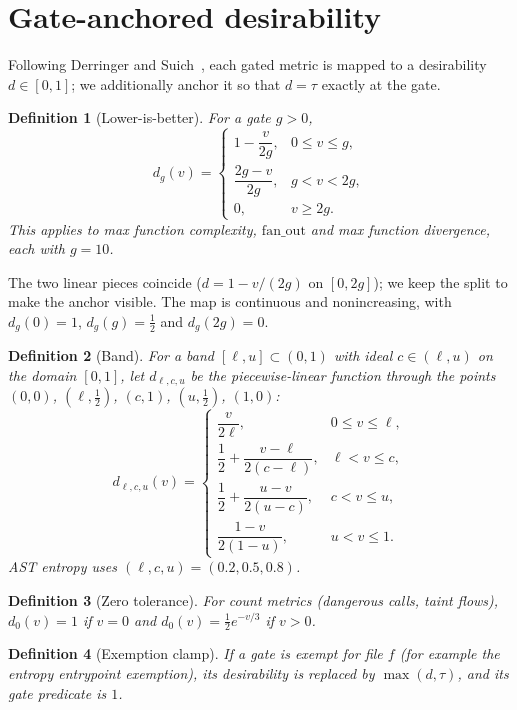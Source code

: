 \documentclass[11pt]{article}
\newtheorem{definition}{Definition}
\theoremstyle{remark}
\begin{document}
\section{Gate-anchored desirability}

Following Derringer and Suich~\cite{derringer1980}, each gated metric is mapped
to a desirability $d \in [0,1]$; we additionally anchor it so that
$d = \tau$ exactly at the gate.

\begin{definition}[Lower-is-better]
For a gate $g > 0$,
\[
d_g(v) =
\begin{cases}
1 - \dfrac{v}{2g}, & 0 \le v \le g,\\[6pt]
\dfrac{2g - v}{2g}, & g < v < 2g,\\[6pt]
0, & v \ge 2g.
\end{cases}
\]
This applies to max function complexity, $\mathrm{fan\_out}$ and max function
divergence, each with $g = 10$.
\end{definition}

The two linear pieces coincide ($d = 1 - v/(2g)$ on $[0, 2g]$); we keep the
split to make the anchor visible. The map is continuous and nonincreasing, with
$d_g(0) = 1$, $d_g(g) = \tfrac12$ and $d_g(2g) = 0$.

\begin{definition}[Band]
For a band $[\ell, u] \subset (0,1)$ with ideal $c \in (\ell, u)$ on the domain
$[0,1]$, let $d_{\ell,c,u}$ be the piecewise-linear function through the points
$(0,0)$, $(\ell, \tfrac12)$, $(c, 1)$, $(u, \tfrac12)$, $(1, 0)$:
\[
d_{\ell,c,u}(v) =
\begin{cases}
\dfrac{v}{2\ell}, & 0 \le v \le \ell,\\[6pt]
\dfrac12 + \dfrac{v - \ell}{2(c - \ell)}, & \ell < v \le c,\\[6pt]
\dfrac12 + \dfrac{u - v}{2(u - c)}, & c < v \le u,\\[6pt]
\dfrac{1 - v}{2(1 - u)}, & u < v \le 1.
\end{cases}
\]
AST entropy uses $(\ell, c, u) = (0.2, 0.5, 0.8)$.
\end{definition}

\begin{definition}[Zero tolerance]
For count metrics (dangerous calls, taint flows),
$d_0(v) = 1$ if $v = 0$ and $d_0(v) = \tfrac12 e^{-v/3}$ if $v > 0$.
\end{definition}

\begin{definition}[Exemption clamp]
If a gate is exempt for file $f$ (for example the entropy entrypoint
exemption), its desirability is replaced by $\max(d, \tau)$, and its gate
predicate is $1$.
\end{definition}
\end{document}
